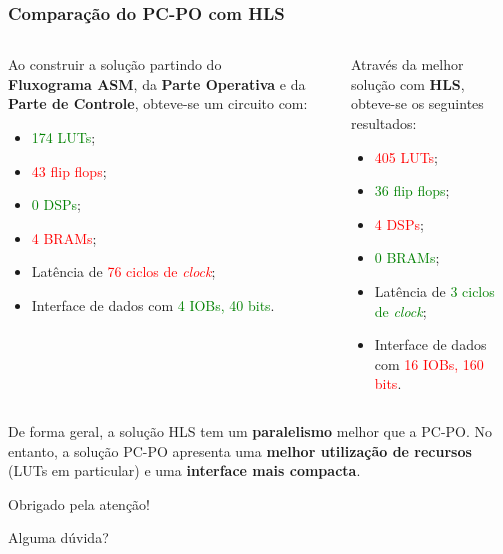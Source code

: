 \documentclass{beamer}
\begin{document}
    \begin{frame}
        \frametitle{Comparação do PC-PO com HLS}
        \begin{columns}
            \begin{column}{0.49\textwidth}
                Ao construir a solução partindo do \textbf{Fluxograma ASM},
                da \textbf{Parte Operativa} e da \textbf{Parte de Controle},
                obteve-se um circuito com:

                \begin{itemize}
                    \item \textcolor<3->{green}{174 LUTs};
                    \item \textcolor<3->{red}{43 flip flops};
                    \item \textcolor<3->{green}{0 DSPs};
                    \item \textcolor<3->{red}{4 BRAMs};
                    \item Latência de \textcolor<3->{red}{76 ciclos de \textit{clock}};
                    \item Interface de dados com \textcolor<3->{green}{4 IOBs, 40 bits}.
                \end{itemize}

            \end{column}

            \begin{column}{0.02\textwidth}
                \rule{.1mm}{0.65\textheight}
            \end{column}
            \begin{column}{0.49\textwidth}
                Através da melhor solução com \textbf{HLS}, obteve-se os
                seguintes resultados:

                \begin{itemize}
                    \item \textcolor<3->{red}{405 LUTs};
                    \item \textcolor<3->{green}{36 flip flops};
                    \item \textcolor<3->{red}{4 DSPs};
                    \item \textcolor<3->{green}{0 BRAMs};
                    \item Latência de \textcolor<3->{green}{3 ciclos de \textit{clock}};
                    \item Interface de dados com \textcolor<3->{red}{16 IOBs, 160 bits}.
                \end{itemize}

            \end{column}
        \end{columns}

        {
            De forma geral, a solução HLS tem um \textbf{paralelismo} melhor que a PC-PO.
            No entanto, a solução PC-PO apresenta uma \textbf{melhor utilização de recursos} (LUTs
            em particular) e uma \textbf{interface mais compacta}.
        }

    \end{frame}

    \begin{frame}
        \centering \huge
        \vfill
        Obrigado pela atenção!

        Alguma dúvida?
        \vfill
    \end{frame}
\end{document}

